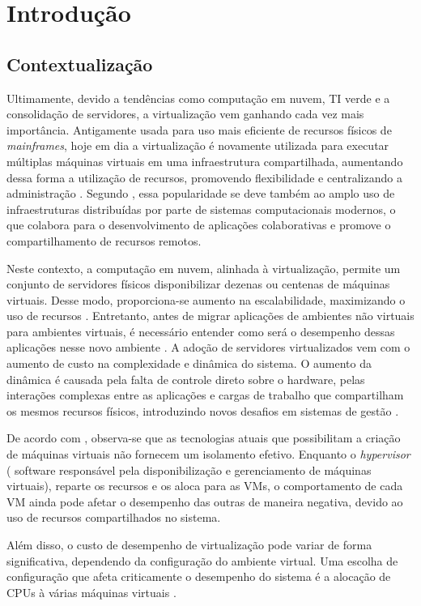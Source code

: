 \chapter{Introdução}
\section{Contextualizaç\~ao}
Ultimamente, devido a tendências como computação em nuvem, TI verde e a consolidação de servidores, a virtualização vem ganhando cada vez mais importância. Antigamente usada para uso mais eficiente de recursos físicos de \textit{mainframes}, hoje em dia a virtualização é novamente utilizada para executar múltiplas máquinas virtuais em uma infraestrutura compartilhada, aumentando dessa forma a utilização de recursos, promovendo flexibilidade e centralizando a administração \cite{huber2011}. Segundo , essa popularidade se deve também ao amplo uso de infraestruturas distribuídas por parte de sistemas computacionais modernos, o que colabora para o desenvolvimento de aplicações colaborativas e promove o compartilhamento de recursos remotos.

Neste contexto, a computação em nuvem, alinhada à virtualização, permite um conjunto de servidores físicos disponibilizar dezenas ou centenas de máquinas virtuais. Desse modo, proporciona-se aumento na escalabilidade, maximizando o uso de recursos  \cite{popiolek2012}. Entretanto, antes de migrar aplicações de ambientes não virtuais para ambientes virtuais, é necessário entender como será o desempenho dessas aplicações nesse novo ambiente \cite{benevuto2006}. A adoção de servidores virtualizados vem com o aumento de custo na complexidade e dinâmica do sistema. O aumento da dinâmica é causada pela falta de controle direto sobre o hardware, pelas interações complexas entre as aplicações e cargas de trabalho que compartilham os mesmos recursos físicos, introduzindo novos desafios em sistemas de gestão \cite{huber2011}.

De acordo com , observa-se que as tecnologias atuais que possibilitam a criação de máquinas virtuais não fornecem um isolamento efetivo. Enquanto o \textit{hypervisor} ( software responsável pela disponibilização e gerenciamento de máquinas virtuais), reparte os recursos e os aloca para as VMs, o comportamento de cada VM ainda pode afetar o desempenho das outras de maneira negativa, devido ao uso de recursos compartilhados no sistema.  

Além disso, o custo de desempenho de virtualização pode variar de forma significativa, dependendo da configuração do ambiente virtual. Uma escolha de configuração que afeta criticamente o desempenho do sistema é a alocação de CPUs à várias máquinas virtuais     \cite{benevuto2006}.

